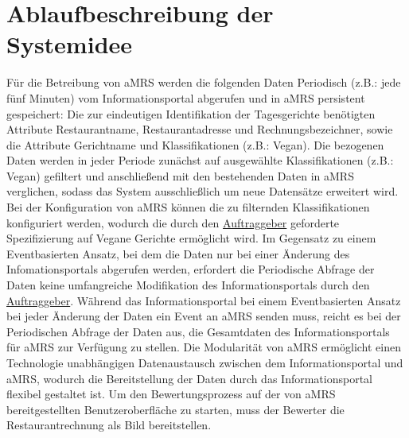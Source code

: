 \section{Ablaufbeschreibung der Systemidee}\label{cha:AblaufbeschreibungderSystemidee}
Für die Betreibung von \ac{aMRS} werden die folgenden Daten Periodisch (z.B.: jede fünf Minuten) vom Informationsportal abgerufen und in \ac{aMRS} persistent gespeichert:
Die zur eindeutigen Identifikation der Tagesgerichte benötigten Attribute Restaurantname, Restaurantadresse und Rechnungsbezeichner, sowie die Attribute Gerichtname und Klassifikationen (z.B.: Vegan).
Die bezogenen Daten werden in jeder Periode zunächst auf ausgewählte Klassifikationen (z.B.: Vegan) gefiltert und anschließend mit den bestehenden Daten in \ac{aMRS} verglichen, sodass das System ausschließlich um neue Datensätze erweitert wird.
Bei der Konfiguration von \ac{aMRS} können die zu filternden Klassifikationen konfiguriert werden, wodurch die durch den \hyperref[gls:auftraggeber]{Auftraggeber} geforderte Spezifizierung auf Vegane Gerichte ermöglicht wird.
\newparagraph
Im Gegensatz zu einem Eventbasierten Ansatz, bei dem die Daten nur bei einer Änderung des Infomationsportals abgerufen werden, erfordert die Periodische Abfrage der Daten keine umfangreiche Modifikation des Informationsportals durch den \hyperref[gls:auftraggeber]{Auftraggeber}.
Während das Informationsportal bei einem Eventbasierten Ansatz bei jeder Änderung der Daten ein Event an \ac{aMRS} senden muss, reicht es bei der Periodischen Abfrage der Daten aus, die Gesamtdaten des Informationsportals für \ac{aMRS} zur Verfügung zu stellen.
\newparagraph
Die Modularität von \ac{aMRS} ermöglicht einen Technologie unabhängigen Datenaustausch zwischen dem Informationsportal und \ac{aMRS}, wodurch die Bereitstellung der Daten durch das Informationsportal flexibel gestaltet ist.
\newparagraph
Um den Bewertungsprozess auf der von \ac{aMRS} bereitgestellten Benutzeroberfläche zu starten, muss der Bewerter die Restaurantrechnung als Bild bereitstellen.

